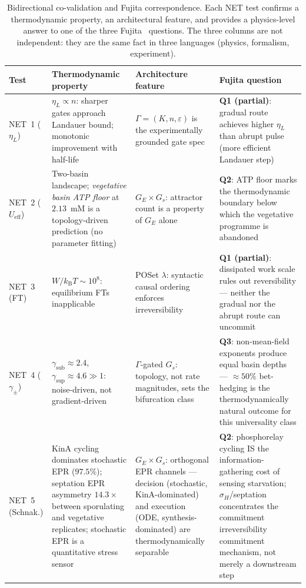 \documentclass[11pt,a4paper]{article}
\newcommand{\kB}{k_{\mathrm{B}}}
\newcommand{\Gs}{G_s}
\newcommand{\Ge}{G_E}
\begin{document}
\begin{table}[h]
\centering
\caption{Bidirectional co-validation and Fujita correspondence.
  Each NET test confirms a thermodynamic property, an architectural feature,
  and provides a physics-level answer to one of the three
  Fujita~\cite{Fujita2005} questions.  The three columns are not independent:
  they are the same fact in three languages (physics, formalism, experiment).}
\label{tab:covalidation}
{\small
\begin{tabular}{p{1.8cm}p{3.8cm}p{3.5cm}p{3.5cm}}
\toprule
Test & Thermodynamic property & Architecture feature & Fujita question \\
\midrule
NET~1 (\(\eta_L\))
  & \(\eta_L \propto n\): sharper gates approach Landauer bound;
    monotonic improvement with half-life
  & \(\Gamma = (K,n,\varepsilon)\) is the experimentally grounded gate spec
  & \textbf{Q1 (partial)}: gradual route achieves higher \(\eta_L\) than
    abrupt pulse (more efficient Landauer step) \\
NET~2 (\(U_{\mathrm{eff}}\))
  & Two-basin landscape; \emph{vegetative basin ATP floor} at $2.13$~mM
    is a topology-driven prediction (no parameter fitting)
  & \(\Ge \times \Gs\): attractor count is a property of \(\Ge\) alone
  & \textbf{Q2}: ATP floor marks the thermodynamic boundary below which
    the vegetative programme is abandoned \\
NET~3 (FT)
  & \(W/\kB T \sim 10^8\): equilibrium FTs inapplicable
  & POSet \(\lambda\): syntactic causal ordering enforces irreversibility
  & \textbf{Q1 (partial)}: dissipated work scale rules out reversibility ---
    neither the gradual nor the abrupt route can uncommit \\
NET~4 (\(\gamma_\pm\))
  & \(\gamma_{\mathrm{sub}} \approx 2.4\), \(\gamma_{\mathrm{sup}} \approx 4.6 \gg 1\):
    noise-driven, not gradient-driven
  & \(\Gamma\)-gated \(\Gs\): topology, not rate magnitudes, sets the
    bifurcation class
  & \textbf{Q3}: non-mean-field exponents produce equal basin depths ---
    $\approx 50\%$ bet-hedging is the thermodynamically natural outcome
    for this universality class \\
NET~5 (Schnak.)
  & KinA cycling dominates stochastic EPR ($97.5\%$);
    septation EPR asymmetry $14.3\times$ between sporulating and
    vegetative replicates; stochastic EPR is a quantitative stress sensor
  & $\Ge \times \Gs$: orthogonal EPR channels — decision (stochastic,
    KinA-dominated) and execution (ODE, synthesis-dominated) are
    thermodynamically separable
  & \textbf{Q2}: phosphorelay cycling IS the information-gathering cost
    of sensing starvation; $\sigma_H$/septation concentrates the
    commitment irreversibility
    commitment mechanism, not merely a downstream step \\
\bottomrule
\end{tabular}}
\end{table}
\end{document}
